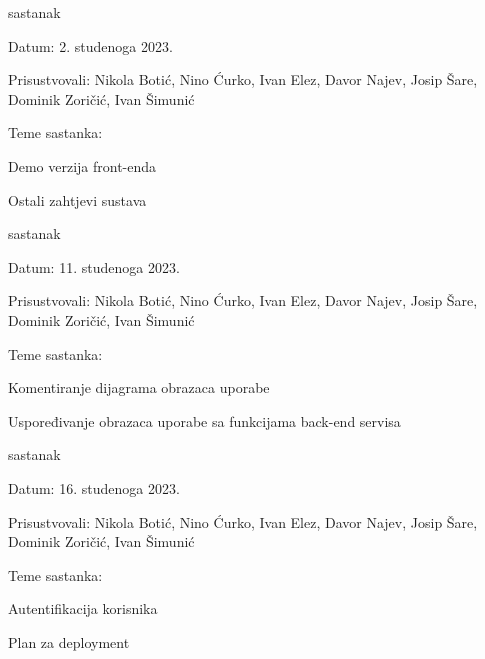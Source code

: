 \begin{packed_enum}
		
		\item  sastanak
			\item[] \begin{packed_item}
				\item Datum: 2. studenoga 2023.
				\item Prisustvovali: Nikola Botić, 
				Nino Ćurko, Ivan Elez,
				Davor Najev, Josip Šare,
				Dominik Zoričić, Ivan Šimunić
				\item Teme sastanka:
				\begin{packed_item}
					\item  Demo verzija front-enda
					\item Ostali zahtjevi sustava
				\end{packed_item}
			\end{packed_item}
			
			\item  sastanak
			\item[] \begin{packed_item}
				\item Datum: 11. studenoga 2023.
				\item Prisustvovali: Nikola Botić, 
				Nino Ćurko, Ivan Elez,
				Davor Najev, Josip Šare,
				Dominik Zoričić, Ivan Šimunić
				\item Teme sastanka:
				\begin{packed_item}
					\item Komentiranje dijagrama obrazaca uporabe
					\item Uspoređivanje obrazaca uporabe sa funkcijama back-end servisa
				\end{packed_item}
			\end{packed_item}
			
			\item  sastanak
			\item[] \begin{packed_item}
				\item Datum: 16. studenoga 2023.
				\item Prisustvovali: Nikola Botić, 
				Nino Ćurko, Ivan Elez,
				Davor Najev, Josip Šare,
				Dominik Zoričić, Ivan Šimunić
				\item Teme sastanka:
				\begin{packed_item}
					\item  Autentifikacija korisnika
					\item Plan za deployment
				\end{packed_item}
			\end{packed_item}
			
		\end{packed_enum}
		
